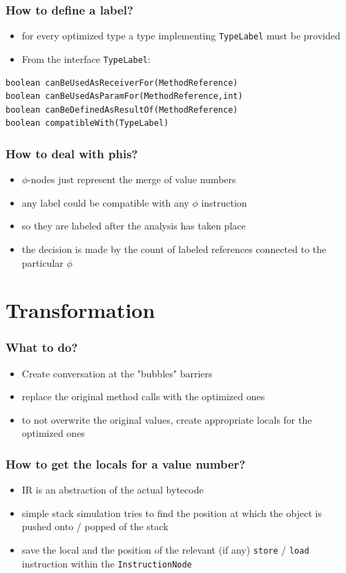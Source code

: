 \documentclass{beamer}
\begin{document}
\begin{frame}[fragile]
  \frametitle{How to define a label?}
  \begin{itemize}
     \item for every optimized type a type implementing \texttt{TypeLabel} must be provided
     \item From the interface \texttt{TypeLabel}:
  \end{itemize}

  \begin{lstlisting}
boolean canBeUsedAsReceiverFor(MethodReference)
boolean canBeUsedAsParamFor(MethodReference,int)
boolean canBeDefinedAsResultOf(MethodReference)
boolean compatibleWith(TypeLabel)
  \end{lstlisting}
\end{frame}

\begin{frame}
  \frametitle{How to deal with phis?}
  \begin{itemize}
    \item $\phi$-nodes just represent the merge of value numbers  
    \item any label could be compatible with any $\phi$ instruction
    \item so they are labeled after the analysis has taken place
    \item the decision is made by the count of labeled references connected to the particular $\phi$
  \end{itemize}
\end{frame}

\section{Transformation}

\frame{\sectionpage}

\begin{frame}
	\frametitle{What to do?}
	\begin{itemize}
    \item Create conversation at the "bubbles" barriers
    \item replace the original method calls with the optimized ones
    \item to not overwrite the original values, create appropriate locals for the optimized ones
	\end{itemize}
\end{frame}

\begin{frame}
	\frametitle{How to get the locals for a value number?}
	\begin{itemize}
    \item IR is an abstraction of the actual bytecode
    \item simple stack simulation tries to find the position at which the object is pushed onto / popped of the stack
    \item save the local and the position of the relevant (if any) \texttt{store} / \texttt{load} instruction within the \texttt{InstructionNode}
	\end{itemize}
\end{frame}
\end{document}
